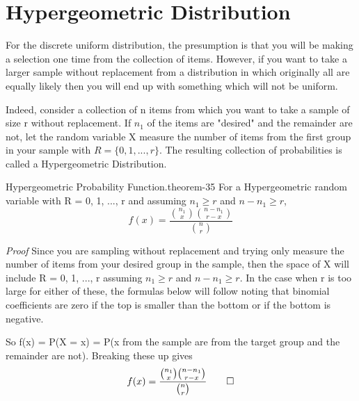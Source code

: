 \documentclass[10pt,]{book}
\makeatletter
\renewcommand*{\proofname}{Proof}
\renewenvironment{proof}[1][\proofname]{\par
  \pushQED{\qed}%
  \normalfont \topsep6\p@\@plus6\p@\relax
  \trivlist
  \item\relax
    {\itshape
    #1\@addpunct{.}}\hspace\labelsep\ignorespaces
}{%
  \popQED\endtrivlist\@endpefalse
}
\numberwithin{equation}{section}
\makeatother
\begin{document}
\section[{Hypergeometric Distribution}]{Hypergeometric Distribution}\label{section-42}
\hypertarget{p-802}{}%
For the discrete uniform distribution, the presumption is that you will be making a selection one time from the collection of items. However, if you want to take a larger sample without replacement from a distribution in which originally all are equally likely then you will end up with something which will not be uniform.%
\par
\hypertarget{p-803}{}%
Indeed, consider a collection of n items from which you want to take a sample of size r without replacement. If \(n_1\) of the items are "desired" and the remainder are not, let the random variable X measure the number of items from the first group in your sample with \(R = \{0, 1, ..., r \}\). The resulting collection of probabilities is called a Hypergeometric Distribution.%
\par
\hypertarget{p-804}{}%
\begin{theorem}{Hypergeometric Probability Function.}{}{theorem-35}%
\hypertarget{HypergeometricFunction}{}%
For a Hypergeometric random variable with R = {0, 1, ..., r} and assuming \(n_1 \ge r\) and \(n-n_1 \ge r\),%
\begin{equation*}
f(x) = \frac{\binom{n_1}{x} \binom{n-n_1}{r-x}}{\binom{n}{r}}
\end{equation*}
%
\end{theorem}
\begin{proof}\hypertarget{proof-37}{}
\hypertarget{p-806}{}%
Since you are sampling without replacement and trying only measure the number of items from your desired group in the sample, then the space of X will include R = {0, 1, ..., r} assuming \(n_1 \ge r\) and \(n-n_1 \ge r\). In the case when r is too large for either of these, the formulas below will follow noting that binomial coefficients are zero if the top is smaller than the bottom or if the bottom is negative.%
\par
\hypertarget{p-807}{}%
So f(x) = P(X = x) = P(x from the sample are from the target group and the remainder are not). Breaking these up gives%
\begin{equation*}
f(x) = \frac{\binom{n_1}{x} \binom{n-n_1}{r-x}}{\binom{n}{r}}\qedhere
\end{equation*}
%
\end{proof}
%
\par
\hypertarget{p-808}{}%
\end{document}
